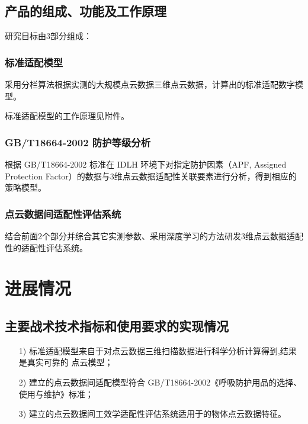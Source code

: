 \documentclass[a4paper,12pt]{ctexbook}	%
\begin{document}
\section{产品的组成、功能及工作原理}

研究目标由3部分组成：

\subsection{标准适配模型}

采用分栏算法根据实测的大规模点云数据三维点云数据，计算出的标准适配数字模型。

标准适配模型的工作原理见附件。

\subsection{GB/T18664-2002 防护等级分析}

根据 GB/T18664-2002 标准在 IDLH 环境下对指定防护因素（APF, Assigned Protection 
Factor）的数据与3维点云数据适配性关联要素进行分析，得到相应的策略模型。

\subsection{点云数据间适配性评估系统}

结合前面2个部分并综合其它实测参数、采用深度学习的方法研发3维点云数据适配性的适配性评估系统。

\chapter{进展情况}

\section{主要战术技术指标和使用要求的实现情况}

\begin{itemize}
\setlength{\parskip}{0pt}
\item[1)]
标准适配模型来自于对点云数据三维扫描数据进行科学分析计算得到,结果是真实可靠的
点云模型；
\item[2)]
建立的点云数据间适配模型符合 GB/T18664-2002《呼吸防护用品的选择、使用与维护》标准；
\item[3)]
建立的点云数据间工效学适配性评估系统适用于的物体点云数据特征。
\end{itemize}
\end{document}
